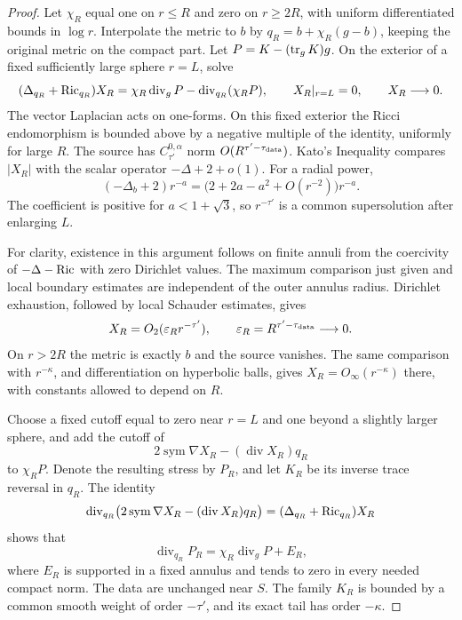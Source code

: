 \begin{proof}
Let \(\chi_R\) equal one on \(r\le R\) and zero on \(r\ge2R\), with
uniform differentiated bounds in \(\log r\).  Interpolate the metric to
\(b\) by \(q_R=b+\chi_R(g-b)\), keeping the original metric on the
compact part.  Let \(P=K-(\operatorname{tr}_gK)g\).  On the exterior of a fixed
sufficiently large sphere \(r=L\), solve
\begin{equation}\label{eq:ah-vector-corrector}
 (\Delta_{q_R}+\operatorname{Ric}_{q_R})X_R
 =\chi_R\operatorname{div}_gP-
       \operatorname{div}_{q_R}(\chi_RP),\qquad
 X_R|_{r=L}=0,\qquad X_R\longrightarrow0 .
\end{equation}
The vector Laplacian acts on one-forms.  On this fixed exterior the
Ricci endomorphism is bounded above by a negative multiple of the
identity, uniformly for large \(R\).  The source has
\(C^{0,\alpha}_{\tau'}\) norm \(O(R^{\tau'-\tau_{\rm data}})\).
Kato's Inequality compares \(|X_R|\) with the scalar operator
\(-\Delta+2+o(1)\).  For a radial power,
\[
 (-\Delta_b+2)r^{-a}
 =\bigl(2+2a-a^2+O(r^{-2})\bigr)r^{-a}.
\]
The coefficient is positive for \(a<1+\sqrt3\), so \(r^{-\tau'}\)
is a common supersolution after enlarging \(L\).

For clarity, existence in this argument follows on finite annuli from
the coercivity of \(-\Delta-\operatorname{Ric}\) with zero Dirichlet values.
The maximum comparison just given and local boundary estimates are
independent of the outer annulus radius.  Dirichlet exhaustion,
followed by local Schauder estimates, gives
\[
 X_R=O_2(\varepsilon_Rr^{-\tau'}),\qquad
 \varepsilon_R=R^{\tau'-\tau_{\rm data}}\longrightarrow0.
\]
On \(r>2R\) the metric is exactly \(b\) and the source vanishes.
The same comparison with \(r^{-\kappa}\), and differentiation on
hyperbolic balls, gives \(X_R=O_\infty(r^{-\kappa})\) there, with
constants allowed to depend on \(R\).

Choose a fixed cutoff equal to zero near \(r=L\) and one beyond a
slightly larger sphere, and add the cutoff of
\[
 2\operatorname{sym}\nabla X_R-(\operatorname{div}X_R)q_R
\]
to \(\chi_RP\).  Denote the resulting stress by \(P_R\), and let \(K_R\)
be its inverse trace reversal in \(q_R\).  The identity
\[
 \operatorname{div}_{q_R}
 \bigl(2\operatorname{sym}\nabla X_R
             -(\operatorname{div}X_R)q_R\bigr)
 =(\Delta_{q_R}+\operatorname{Ric}_{q_R})X_R
\]
shows that
\[
 \operatorname{div}_{q_R}P_R
 =\chi_R\operatorname{div}_gP+E_R ,
\]
where \(E_R\) is supported in a fixed annulus and tends to zero in
every needed compact norm.  The data are unchanged near \(S\).
The family \(K_R\) is bounded by a common smooth weight of order
\(-\tau'\), and its exact tail has order \(-\kappa\).


\end{proof}
